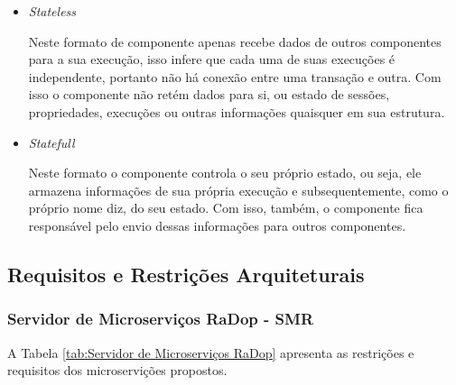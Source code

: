 \begin{itemize}


\item{\emph{Stateless}}\label{stateless}

Neste formato de componente apenas recebe dados de outros componentes
para a sua execução, isso infere que cada uma de suas execuções é
independente, portanto não há conexão entre uma transação e outra. Com
isso o componente não retém dados para si, ou estado de sessões,
propriedades, execuções ou outras informações quaisquer em sua
estrutura.

\item{\emph{Statefull}}\label{statefull}

Neste formato o componente controla o seu próprio estado, ou seja, ele
armazena informações de sua própria execução e subsequentemente, como o
próprio nome diz, do seu estado. Com isso, também, o componente fica
responsável pelo envio dessas informações para outros componentes.

\end{itemize}

\subsection{Requisitos e Restrições Arquiteturais}\label{requisitos-e-restricoes-arquiteturais}

\subsubsection{Servidor de Microserviços RaDop - SMR}\label{req-servidor-de-microservicos-radop---smr}

A Tabela \ref{tab:Servidor de Microserviços RaDop} apresenta as restrições e requisitos dos microservições propostos.

